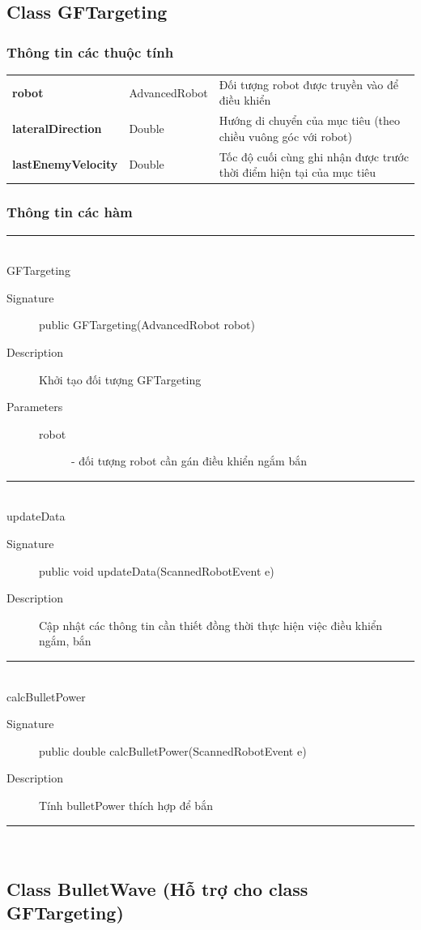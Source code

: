 \documentclass[14pt]{article}
\newcommand{\sep}{\rule{\textwidth}{0.007pt}\\}
\begin{document}
\subsection{Class GFTargeting}
\subsubsection{Thông tin các thuộc tính}
\begin{tabular}{llp{5cm}}
\textbf{robot}&AdvancedRobot&Đối tượng robot được truyền vào để điều khiển\\
\textbf{lateralDirection}&Double&Hướng di chuyển của mục tiêu (theo chiều vuông góc với robot)\\
\textbf{lastEnemyVelocity}&Double&Tốc độ cuối cùng ghi nhận được trước thời điểm hiện tại của mục tiêu\\
\end{tabular}

\subsubsection{Thông tin các hàm}
\sep
GFTargeting
	\begin{description}
		\item[Signature] public GFTargeting(AdvancedRobot robot)
		\item[Description] Khởi tạo đối tượng GFTargeting
		\item[Parameters]
		\begin{description}
				\item[robot] - đối tượng robot cần gán điều khiển ngắm bắn
			\end{description}
		\end{description}
\sep
updateData
	\begin{description}
		\item[Signature]public void updateData(ScannedRobotEvent e)
		\item[Description] Cập nhật các thông tin cần thiết đồng thời thực hiện việc điều khiển ngắm, bắn
	\end{description}		
\sep
calcBulletPower
	\begin{description}
		\item[Signature]public double calcBulletPower(ScannedRobotEvent e)
		\item[Description] Tính bulletPower thích hợp để bắn
	\end{description}		
\sep

\subsection{Class BulletWave (Hỗ trợ cho class GFTargeting)}
\end{document}
